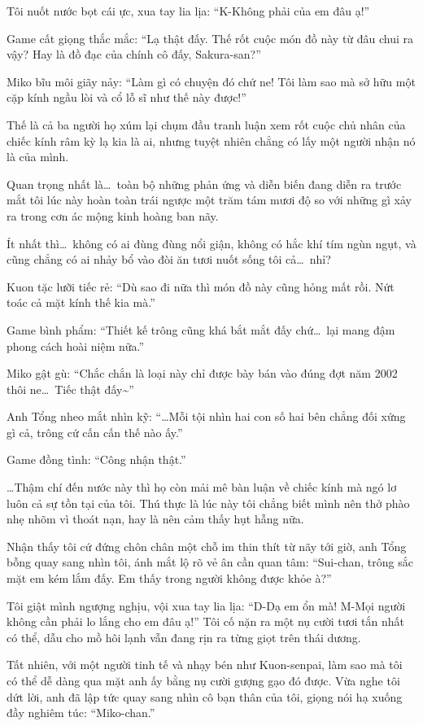 \documentclass[../main.tex]{subfiles}
\begin{document}
Tôi nuốt nước bọt cái ực, xua tay lia lịa: ``K-Không phải của em đâu ạ!''

Game cất giọng thắc mắc: ``Lạ thật đấy. Thế rốt cuộc món đồ này từ đâu chui ra vậy? Hay là đồ đạc của chính cô đấy, Sakura-san?''

Miko bĩu môi giãy nảy: ``Làm gì có chuyện đó chứ ne! Tôi làm sao mà sở hữu một cặp kính ngầu lòi và cổ lỗ sĩ như thế này được!''

Thế là cả ba người họ xúm lại chụm đầu tranh luận xem rốt cuộc chủ nhân của chiếc kính râm kỳ lạ kia là ai, nhưng tuyệt nhiên chẳng có lấy một người nhận nó là của mình.

Quan trọng nhất là\dots\ toàn bộ những phản ứng và diễn biến đang diễn ra trước mắt tôi lúc này hoàn toàn trái ngược một trăm tám mươi độ so với những gì xảy ra trong cơn ác mộng kinh hoàng ban nãy.

Ít nhất thì\dots\ không có ai đùng đùng nổi giận, không có hắc khí tím ngùn ngụt, và cũng chẳng có ai nhảy bổ vào đòi ăn tươi nuốt sống tôi cả\dots\ nhỉ?

Kuon tặc lưỡi tiếc rẻ: ``Dù sao đi nữa thì món đồ này cũng hỏng mất rồi. Nứt toác cả mặt kính thế kia mà.''

Game bình phẩm: ``Thiết kế trông cũng khá bắt mắt đấy chứ\dots\ lại mang đậm phong cách hoài niệm nữa.''

Miko gật gù: ``Chắc chắn là loại này chỉ được bày bán vào đúng đợt năm 2002 thôi ne\dots\ Tiếc thật đấy\~{}''

Anh Tổng nheo mắt nhìn kỹ: ``\dots Mỗi tội nhìn hai con số hai bên chẳng đối xứng gì cả, trông cứ cấn cấn thế nào ấy.''

Game đồng tình: ``Công nhận thật.''

\dots Thậm chí đến nước này thì họ còn mải mê bàn luận về chiếc kính mà ngó lơ luôn cả sự tồn tại của tôi. Thú thực là lúc này tôi chẳng biết mình nên thở phào nhẹ nhõm vì thoát nạn, hay là nên cảm thấy hụt hẫng nữa.

Nhận thấy tôi cứ đứng chôn chân một chỗ im thin thít từ nãy tới giờ, anh Tổng bỗng quay sang nhìn tôi, ánh mắt lộ rõ vẻ ân cần quan tâm: ``Sui-chan, trông sắc mặt em kém lắm đấy. Em thấy trong người không được khỏe à?''

Tôi giật mình ngượng nghịu, vội xua tay lia lịa: ``D-Dạ em ổn mà! M-Mọi người không cần phải lo lắng cho em đâu ạ!'' Tôi cố nặn ra một nụ cười tươi tắn nhất có thể, dẫu cho mồ hôi lạnh vẫn đang rịn ra từng giọt trên thái dương.

Tất nhiên, với một người tinh tế và nhạy bén như Kuon-senpai, làm sao mà tôi có thể dễ dàng qua mặt anh ấy bằng nụ cười gượng gạo đó được. Vừa nghe tôi dứt lời, anh đã lập tức quay sang nhìn cô bạn thân của tôi, giọng nói hạ xuống đầy nghiêm túc: ``Miko-chan.''
\end{document}
